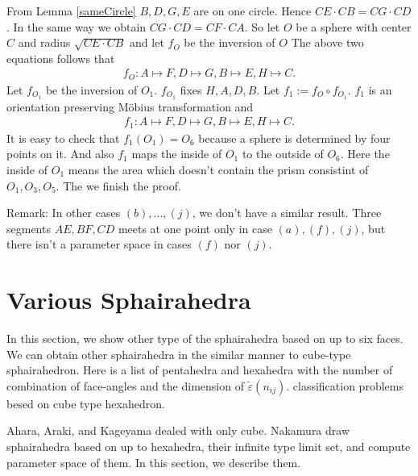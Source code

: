 \documentclass[dvipdfmx]{interact}
\theoremstyle{plain}%
\theoremstyle{definition}
\theoremstyle{remark}
\theoremstyle{problemstyle}
\begin{document}
From Lemma \ref{sameCircle} $B, D, G, E$ are on one circle. Hence
$CE \cdot CB = CG \cdot CD$. In the same way we obtain 
$CG \cdot CD = CF \cdot CA$. So let $O$ be a sphere with center $C$ and
radius $\sqrt{CE \cdot CB}$ and let $f_O$ be the inversion of $O$
The above two equations follows that
\begin{align*}
 f_O: A \mapsto F, D \mapsto G, B \mapsto E, H \mapsto C.
\end{align*}
Let $f_{O_1}$ be the inversion of $O_1$. $f_{O_1}$ fixes $H, A, D, B$.
Let $f_1 := f_O \circ f_{O_1}$.
$f_1$ is an orientation preserving M\"obius transformation and
\begin{align*}
 f_1 : A \mapsto F, D \mapsto G, B \mapsto E, H \mapsto C.
\end{align*}
It is easy to check that $f_1(O_1) = O_6$ because a sphere is determined
by four points on it. And also $f_1$ maps the inside of $O_1$ to the
outside of $O_6$. Here the inside of $O_1$ means the area which doesn't
contain the prism consistint of $O_1, O_3, O_5$. The we finish the
proof.

Remark:
In other cases $(b),...,(j)$, we don't have a similar result. Three
segments $AE, BF, CD$ meets at one point only in case $(a), (f), (j)$, but
there isn't a parameter space in cases $(f)$ nor $(j)$.


\section{Various Sphairahedra}

In this section, we show other type of the sphairahedra based on up to
six faces.
We can obtain other sphairahedra in the similar manner to cube-type
sphairahedron.
Here is a list of pentahedra and hexahedra with the number of combination of face-angles
and the dimension of $\tilde{\varepsilon}(n_{ij})$.
classification problems besed on cube type hexahedron.

Ahara, Araki, and Kageyama dealed with only cube.
Nakamura draw sphairahedra based on up to hexahedra, their infinite
type limit set, and compute parameter space of them.
In this section, we describe them.
\end{document}
